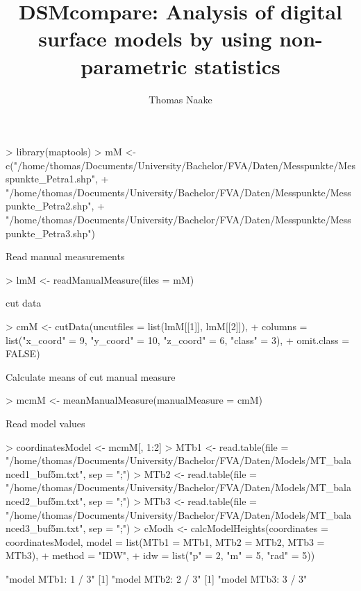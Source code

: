 \documentclass[a4paper]{article}
\title{DSMcompare: Analysis of digital surface models by using non-parametric statistics}
\author{Thomas Naake}
\begin{document}
\maketitle

\begin{Schunk}
\begin{Sinput}
> library(maptools)
> mM <- c("/home/thomas/Documents/University/Bachelor/FVA/Daten/Messpunkte/Messpunkte_Petra1.shp",
+         "/home/thomas/Documents/University/Bachelor/FVA/Daten/Messpunkte/Messpunkte_Petra2.shp",
+         "/home/thomas/Documents/University/Bachelor/FVA/Daten/Messpunkte/Messpunkte_Petra3.shp")
\end{Sinput}
\end{Schunk}
Read manual measurements
\begin{Schunk}
\begin{Sinput}
> lmM <- readManualMeasure(files = mM)
\end{Sinput}
\end{Schunk}

cut data
\begin{Schunk}
\begin{Sinput}
> cmM <- cutData(uncutfiles = list(lmM[[1]], lmM[[2]]), 
+                columns = list("x_coord" = 9, "y_coord" = 10, "z_coord" = 6, "class" = 3),
+                omit.class = FALSE)
\end{Sinput}
\end{Schunk}

Calculate means of cut manual measure
\begin{Schunk}
\begin{Sinput}
> mcmM <- meanManualMeasure(manualMeasure = cmM)
\end{Sinput}
\end{Schunk}

Read model values
\begin{Schunk}
\begin{Sinput}
> coordinatesModel <- mcmM[, 1:2]
> MTb1 <- read.table(file = "/home/thomas/Documents/University/Bachelor/FVA/Daten/Models/MT_balanced1_buf5m.txt", sep = ";")
> MTb2 <- read.table(file = "/home/thomas/Documents/University/Bachelor/FVA/Daten/Models/MT_balanced2_buf5m.txt", sep = ";")
> MTb3 <- read.table(file = "/home/thomas/Documents/University/Bachelor/FVA/Daten/Models/MT_balanced3_buf5m.txt", sep = ";")
> cModh <- calcModelHeights(coordinates = coordinatesModel, model = list(MTb1 = MTb1, MTb2 = MTb2, MTb3 = MTb3),
+                           method = "IDW",
+                           idw = list("p" = 2, "m" = 5, "rad" = 5))
\end{Sinput}
\begin{Soutput}
[1] "model MTb1: 1 / 3"
[1] "model MTb2: 2 / 3"
[1] "model MTb3: 3 / 3"
\end{Soutput}
\end{Schunk}
\end{document}

